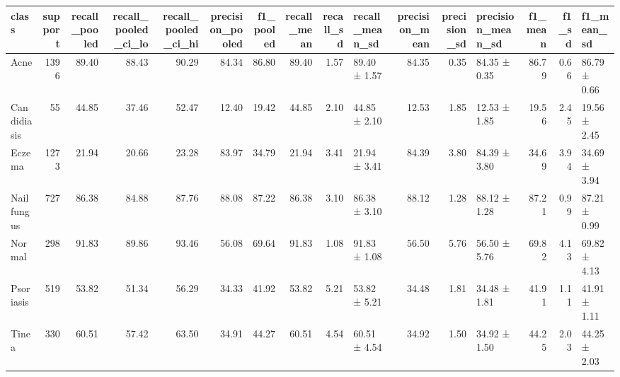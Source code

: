 \begin{tabular}{lrrrrrrrrlrrlrrl}
\toprule
class & support & recall\_pooled & recall\_pooled\_ci\_lo & recall\_pooled\_ci\_hi & precision\_pooled & f1\_pooled & recall\_mean & recall\_sd & recall\_mean\_sd & precision\_mean & precision\_sd & precision\_mean\_sd & f1\_mean & f1\_sd & f1\_mean\_sd \\
\midrule
Acne & 1396 & 89.40 & 88.43 & 90.29 & 84.34 & 86.80 & 89.40 & 1.57 & 89.40 ± 1.57 & 84.35 & 0.35 & 84.35 ± 0.35 & 86.79 & 0.66 & 86.79 ± 0.66 \\
Candidiasis & 55 & 44.85 & 37.46 & 52.47 & 12.40 & 19.42 & 44.85 & 2.10 & 44.85 ± 2.10 & 12.53 & 1.85 & 12.53 ± 1.85 & 19.56 & 2.45 & 19.56 ± 2.45 \\
Eczema & 1273 & 21.94 & 20.66 & 23.28 & 83.97 & 34.79 & 21.94 & 3.41 & 21.94 ± 3.41 & 84.39 & 3.80 & 84.39 ± 3.80 & 34.69 & 3.94 & 34.69 ± 3.94 \\
Nail fungus & 727 & 86.38 & 84.88 & 87.76 & 88.08 & 87.22 & 86.38 & 3.10 & 86.38 ± 3.10 & 88.12 & 1.28 & 88.12 ± 1.28 & 87.21 & 0.99 & 87.21 ± 0.99 \\
Normal & 298 & 91.83 & 89.86 & 93.46 & 56.08 & 69.64 & 91.83 & 1.08 & 91.83 ± 1.08 & 56.50 & 5.76 & 56.50 ± 5.76 & 69.82 & 4.13 & 69.82 ± 4.13 \\
Psoriasis & 519 & 53.82 & 51.34 & 56.29 & 34.33 & 41.92 & 53.82 & 5.21 & 53.82 ± 5.21 & 34.48 & 1.81 & 34.48 ± 1.81 & 41.91 & 1.11 & 41.91 ± 1.11 \\
Tinea & 330 & 60.51 & 57.42 & 63.50 & 34.91 & 44.27 & 60.51 & 4.54 & 60.51 ± 4.54 & 34.92 & 1.50 & 34.92 ± 1.50 & 44.25 & 2.03 & 44.25 ± 2.03 \\
\bottomrule
\end{tabular}
